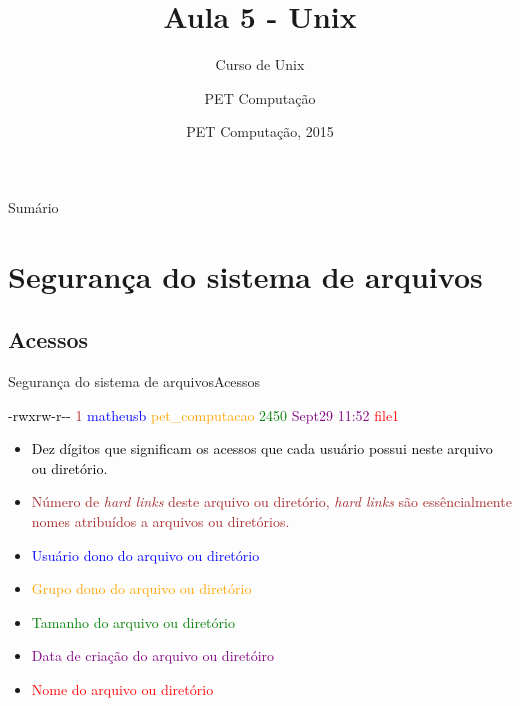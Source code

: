\documentclass{beamer}
\title{Aula 5 - Unix}
\subtitle{Curso de Unix}
\author{PET Computa\c{c}ão}
\institute[UFSC] %
{
%
  Departamento de Informática e Estatística\\
  Universidade de Santa Catarina}
\date{PET Computa\c{c}ão, 2015}
\begin{document}
\begin{frame}
  \titlepage
\end{frame}

\begin{frame}{Sumário}
  \tableofcontents
\end{frame}

\section{Seguran\c{c}a do sistema de arquivos}

\subsection{Acessos}

\begin{frame}{Seguran\c{c}a do sistema de arquivos}{Acessos}
   \begin{block}{}
\textcolor{black}{-rwxrw-r-\--} \textcolor{brown}{1} \textcolor{blue}{matheusb} \textcolor{orange}{pet\_computacao} \textcolor{green}{2450} \textcolor{purple}{Sept29 11:52} \textcolor{red}{file1}
\end{block}
   \begin{itemize}
   \item {\textcolor{black}{Dez dígitos que significam os acessos que cada usuário possui neste arquivo ou diretório.}}
   \item{\textcolor{brown}{Número de \textit{hard links} deste arquivo ou diretório, \textit{hard links} são essêncialmente nomes atribuídos a arquivos ou diretórios.}}
   \item{\textcolor{blue}{Usuário dono do arquivo ou diretório}}
  \item{\textcolor{orange}{Grupo dono do arquivo ou diretório}}
  \item{\textcolor{green}{Tamanho do arquivo ou diretório}}
  \item{\textcolor{purple}{Data de cria\c{c}ão do arquivo ou diretóiro}}
  \item{\textcolor{red}{Nome do arquivo ou diretório}}
  \end{itemize}
\end{frame}
\end{document}

